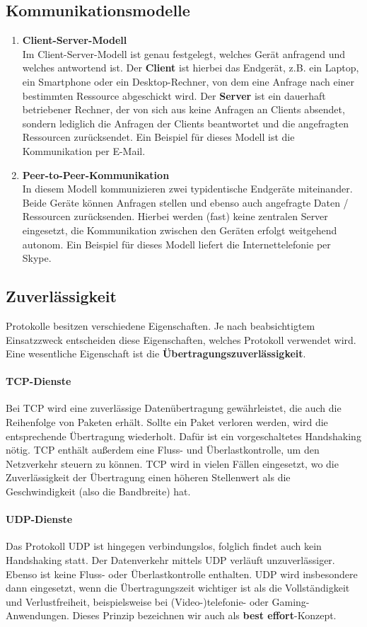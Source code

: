 \documentclass[11pt,a4paper]{scrartcl}
\begin{document}
\subsection{Kommunikationsmodelle}
\begin{enumerate}
\item \textbf{Client-Server-Modell} \\
Im Client-Server-Modell ist genau festgelegt, welches Gerät anfragend und welches antwortend ist. Der \textbf{Client} ist hierbei das Endgerät, z.B. ein Laptop, ein Smartphone oder ein Desktop-Rechner, von dem eine Anfrage nach einer bestimmten Ressource abgeschickt wird. Der \textbf{Server} ist ein dauerhaft betriebener Rechner, der von sich aus keine Anfragen an Clients absendet, sondern lediglich die Anfragen der Clients beantwortet und die angefragten Ressourcen zurücksendet. Ein Beispiel für dieses Modell ist die Kommunikation per E-Mail.
\item \textbf{Peer-to-Peer-Kommunikation} \\
In diesem Modell kommunizieren zwei typidentische Endgeräte miteinander. Beide Geräte können Anfragen stellen und ebenso auch angefragte Daten / Ressourcen zurücksenden. Hierbei werden (fast) keine zentralen Server eingesetzt, die Kommunikation zwischen den Geräten erfolgt weitgehend autonom. Ein Beispiel für dieses Modell liefert die Internettelefonie per Skype.
\end{enumerate}
\subsection{Zuverlässigkeit}
Protokolle besitzen verschiedene Eigenschaften. Je nach beabsichtigtem Einsatzzweck entscheiden diese Eigenschaften, welches Protokoll verwendet wird. Eine wesentliche Eigenschaft ist die \textbf{Übertragungszuverlässigkeit}.
\paragraph{TCP-Dienste} Bei TCP wird eine zuverlässige Datenübertragung gewährleistet, die auch die Reihenfolge von Paketen erhält. Sollte ein Paket verloren werden, wird die entsprechende Übertragung wiederholt. Dafür ist ein vorgeschaltetes Handshaking nötig. TCP enthält außerdem eine Fluss- und Überlastkontrolle, um den Netzverkehr steuern zu können. TCP wird in vielen Fällen eingesetzt, wo die Zuverlässigkeit der Übertragung einen höheren Stellenwert als die Geschwindigkeit (also die Bandbreite) hat. \parencite{RFC793}
\paragraph{UDP-Dienste} Das Protokoll UDP ist hingegen verbindungslos, folglich findet auch kein Handshaking statt. Der Datenverkehr mittels UDP verläuft unzuverlässiger. Ebenso ist keine Fluss- oder Überlastkontrolle enthalten. UDP wird insbesondere dann eingesetzt, wenn die Übertragungszeit wichtiger ist als die Vollständigkeit und Verlustfreiheit, beispielsweise bei (Video-)telefonie- oder Gaming-Anwendungen. Dieses Prinzip bezeichnen wir auch als \textbf{best effort}-Konzept. \parencite{RFC768}
\end{document}
